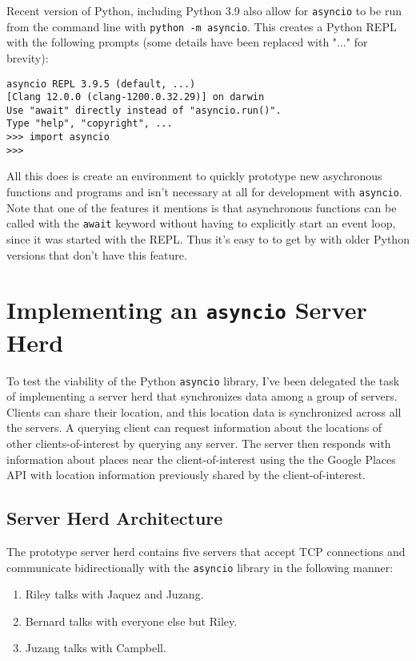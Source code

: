 Recent version of Python, including Python 3.9 also allow for \texttt{asyncio} to be run from the command line with \texttt{python -m asyncio}. This creates a Python REPL with the following prompts (some details have been replaced with "..." for brevity):
\begin{verbatim}
asyncio REPL 3.9.5 (default, ...) 
[Clang 12.0.0 (clang-1200.0.32.29)] on darwin
Use "await" directly instead of "asyncio.run()".
Type "help", "copyright", ...
>>> import asyncio
>>> 
\end{verbatim}
All this does is create an environment to quickly prototype new asychronous functions and programs and isn't necessary at all for development with \texttt{asyncio}. Note that one of the features it mentions is that asynchronous functions can be called with the \texttt{await} keyword without having to explicitly start an event loop, since it was started with the REPL. Thus it's easy to to get by with older Python versions that don't have this feature.

\section{Implementing an \texttt{asyncio} Server Herd}
To test the viability of the Python \texttt{asyncio} library, I've been delegated the task of implementing a server herd that synchronizes data among a group of servers. Clients can share their location, and this location data is synchronized across all the servers. A querying client can request information about the locations of other clients-of-interest by querying any server. The server then responds with information about places near the client-of-interest using the the Google Places API with location information previously shared by the client-of-interest.

\subsection{Server Herd Architecture}
The prototype server herd contains five servers that accept TCP connections and communicate bidirectionally with the \texttt{asyncio} library in the following manner:
\begin{enumerate}
  \item Riley talks with Jaquez and Juzang.
  \item Bernard talks with everyone else but Riley.
  \item Juzang talks with Campbell.
\end{enumerate}

